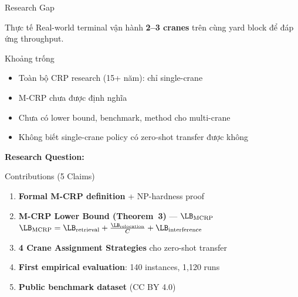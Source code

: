 \documentclass[aspectratio=169,11pt]{beamer}
\begin{document}
\begin{frame}{Research Gap}
\begin{block}{Thực tế}
Real-world terminal vận hành \textbf{2--3 cranes} trên cùng yard block để đáp ứng throughput.
\end{block}

\begin{block}{Khoảng trống}
\begin{itemize}
    \item Toàn bộ CRP research (15+ năm): chỉ single-crane
    \item M-CRP chưa được định nghĩa
    \item Chưa có lower bound, benchmark, method cho multi-crane
    \item Không biết single-crane policy có zero-shot transfer được không
\end{itemize}
\end{block}

\vspace{0.3cm}
\centering\textbf{\large Research Question:}
\vspace{0.2cm}
\par\centering\emph{}
\end{frame}

\begin{frame}{Contributions (5 Claims)}
\begin{enumerate}
    \item[{[C1]}] \textbf{Formal M-CRP definition} + NP-hardness proof
    \item[{[C2]}] \textbf{M-CRP Lower Bound (Theorem~3)} — $\LB_{\text{MCRP}}$ \\ 
        $\LB_{\text{MCRP}} = \LB_{\text{retrieval}} + \frac{\LB_{\text{relocation}}}{C} + \LB_{\text{interference}}$
    \item[{[C3]}] \textbf{4 Crane Assignment Strategies} cho zero-shot transfer
    \item[{[C4]}] \textbf{First empirical evaluation}: 140 instances, 1,120 runs
    \item[{[C5]}] \textbf{Public benchmark dataset} (CC BY 4.0)
\end{enumerate}
\end{frame}
\end{document}
